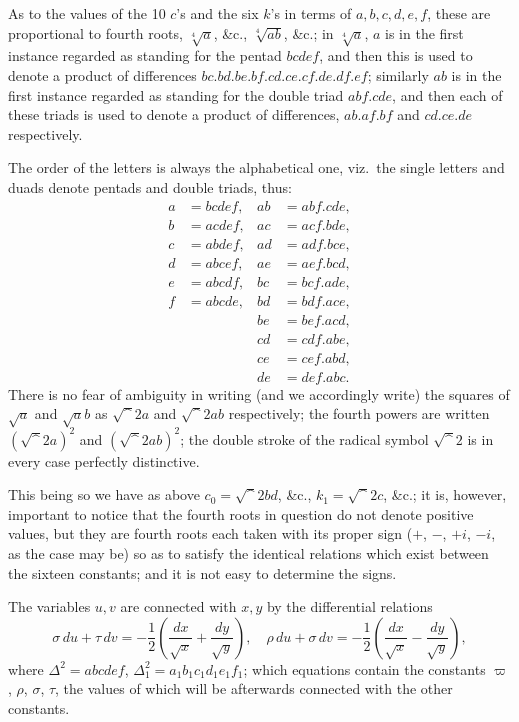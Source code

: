 \documentclass[11pt,a4paper]{book}
\begin{document}
As to the values of the 10 $c$'s and the six $k$'s in terms of $a,b,c,d,e,f$, these are proportional to fourth roots, $\sqrt[4]{a}$, \&c., $\sqrt[4]{ab}$, \&c.; in $\sqrt[4]{a}$, $a$ is in the first instance regarded as standing for the pentad $bcdef$, and then this is used to denote a product of differences $bc.bd.be.bf.cd.ce.cf.de.df.ef$; similarly $ab$ is in the first instance regarded as standing for the double triad $abf.cde$, and then each of these triads is used to denote a product of differences, $ab.af.bf$ and $cd.ce.de$ respectively.

The order of the letters is always the alphabetical one, viz.\ the single letters and duads denote pentads and double triads, thus:
\begin{align*}
a &= bcdef, & ab &= abf.cde, \\
b &= acdef, & ac &= acf.bde, \\
c &= abdef, & ad &= adf.bce, \\
d &= abcef, & ae &= aef.bcd, \\
e &= abcdf, & bc &= bcf.ade, \\
f &= abcde, & bd &= bdf.ace, \\
& & be &= bef.acd, \\
& & cd &= cdf.abe, \\
& & ce &= cef.abd, \\
& & de &= def.abc.
\end{align*}
There is no fear of ambiguity in writing (and we accordingly write) the squares of $\surd a$ and $\surd ab$ as $\surd^2 a$ and $\surd^2 ab$ respectively; the fourth powers are written $(\surd^2 a)^2$ and $(\surd^2 ab)^2$; the double stroke of the radical symbol $\surd^2$ is in every case perfectly distinctive.

This being so we have as above $c_0 = \surd^2 bd$, \&c., $k_1 = \surd^2 c$, \&c.; it is, however, important to notice that the fourth roots in question do not denote positive values, but they are fourth roots each taken with its proper sign ($+$, $-$, $+i$, $-i$, as the case may be) so as to satisfy the identical relations which exist between the sixteen constants; and it is not easy to determine the signs.

The variables $u,v$ are connected with $x,y$ by the differential relations
\[
\sigma\,du + \tau\,dv = -\frac{1}{2}\left(\frac{dx}{\surd x} + \frac{dy}{\surd y}\right),\quad
\rho\,du + \sigma\,dv = -\frac{1}{2}\left(\frac{dx}{\surd x} - \frac{dy}{\surd y}\right),
\]
where $\Delta^2 = abcdef$, $\Delta_1^2 = a_1b_1c_1d_1e_1f_1$; which equations contain the constants $\varpi$, $\rho$, $\sigma$, $\tau$, the values of which will be afterwards connected with the other constants.
\end{document}
